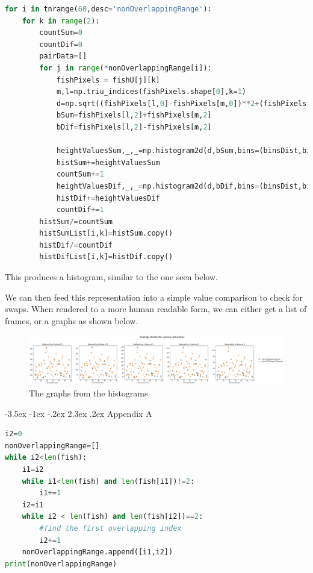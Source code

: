 \documentclass{article}
\makeatletter
\renewcommand\section{\clearpage\newpage\@startsection {section}{1}{\z@}%
	{-3.5ex \@plus -1ex \@minus -.2ex}%
	{2.3ex \@plus.2ex}%
	{\normalfont\Large\bfseries}}
\makeatother
\begin{document}
\begin{minipage}[c]{\textwidth}
\begin{lstlisting}[language=Python]
for i in tnrange(60,desc='nonOverlappingRange'):
    for k in range(2):
        countSum=0
        countDif=0
        pairData=[]
        for j in range(*nonOverlappingRange[i]):
            fishPixels = fishU[j][k]
            m,l=np.triu_indices(fishPixels.shape[0],k=1)
            d=np.sqrt((fishPixels[l,0]-fishPixels[m,0])**2+(fishPixels[l,1]-fishPixels[m,1])**2)
            bSum=fishPixels[l,2]+fishPixels[m,2]
            bDif=fishPixels[l,2]-fishPixels[m,2]

            heightValuesSum,_,_=np.histogram2d(d,bSum,bins=(binsDist,binsSum))
            histSum+=heightValuesSum
            countSum+=1
            heightValuesDif,_,_=np.histogram2d(d,bDif,bins=(binsDist,binsDif))
            histDif+=heightValuesDif
            countDif+=1
        histSum/=countSum
        histSumList[i,k]=histSum.copy()
        histDif/=countDif
        histDifList[i,k]=histDif.copy()
\end{lstlisting}
\end{minipage}

This produces a histogram, similar to the one seen below.

We can then feed this representation into a simple value comparison to check for swaps. When rendered to a more human readable form, we can either get a list of frames, or a graphs as shown below.

\begin{figure}[H]
	\centering
	\includegraphics[width=\linewidth]{reducedGraph}
	\caption{The graphs from the histograms}
	\label{fig:reducedGraph}
\end{figure}


\appendix
\section{Appendix A}
\label{appendix1}

\begin{minipage}[c]{\textwidth}
\begin{lstlisting}[language=Python]
i2=0
nonOverlappingRange=[]
while i2<len(fish):
    i1=i2
    while i1<len(fish) and len(fish[i1])!=2:
        i1+=1
    i2=i1
    while i2 < len(fish) and len(fish[i2])==2:
        #find the first overlapping index
        i2+=1
    nonOverlappingRange.append([i1,i2])
print(nonOverlappingRange)
\end{lstlisting}
\end{minipage}
\end{document}
